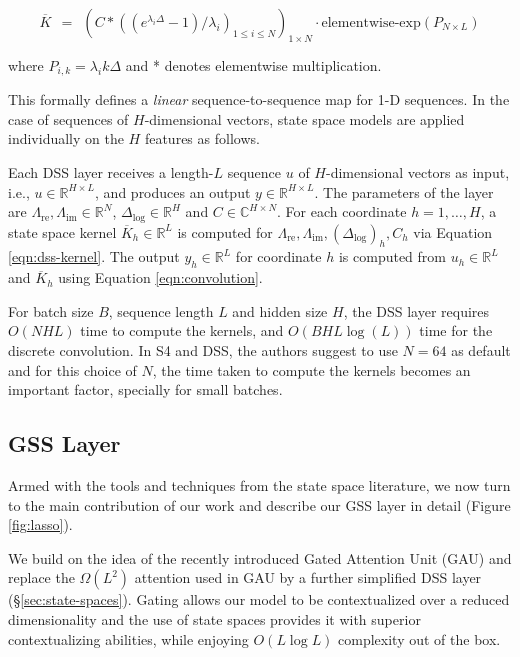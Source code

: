 \begin{equation}\label{eqn:dss-kernel}
\overline{K}\ \ =\ \ (C * \left( (e^{\lambda_i\Delta} - 1) / \lambda_i \right)_{1\leq i \leq N})_{1\times N} \cdot \mathrm{elementwise}\text{-}\mathrm{exp}(P_{N\times L})
\end{equation}

where $P_{i,k} = \lambda_i k\Delta$ and * denotes elementwise multiplication.

This formally defines a \textit{linear} sequence-to-sequence map for 1-D sequences. In the case of sequences of $H$-dimensional vectors, state space models are applied individually on the $H$ features as follows. 

Each \textsc{DSS}  layer receives a length-$L$ sequence $u$ of $H$-dimensional vectors as input, i.e., $u \in \mathbb{R}^{H\times L}$, and produces an output $y \in \mathbb{R}^{H\times L}$. The parameters of the layer are $\Lambda_\mathrm{re}, \Lambda_\mathrm{im} \in \mathbb{R}^N$, $\Delta_{\log} \in \mathbb{R}^{H}$ and $C \in \mathbb{C}^{H \times N}$. For each coordinate $h=1,\ldots,H$, a state space kernel $\overline{K}_h \in \mathbb{R}^L$ is computed for $\Lambda_\mathrm{re}, \Lambda_\mathrm{im}, (\Delta_{\log})_h, C_h$ via Equation \ref{eqn:dss-kernel}. The output $y_h \in \mathbb{R}^L$ for coordinate $h$ is computed from $u_h \in \mathbb{R}^L$ and $\overline{K}_h$ using Equation \ref{eqn:convolution}.

For batch size $B$, sequence length $L$ and hidden size $H$, the DSS layer requires $O(NHL)$ time to compute the kernels, and $O(BHL\log(L))$ time for the discrete convolution. In S4 and DSS, the authors suggest to use $N=64$ as default and for this choice of $N$, the time taken to compute the kernels becomes an important factor, specially for small batches.

\subsection{GSS Layer}\label{sec:lasso}

Armed with the tools and techniques from the state space literature, we now turn to the main contribution of our work and describe our GSS layer in detail (Figure \ref{fig:lasso}).

We build on the idea of the recently introduced Gated Attention Unit (GAU) \citep{flash_hua2022transformer} and replace the $\Omega(L^2)$ attention used in GAU by a further simplified \textsc{DSS}  layer (\S\ref{sec:state-spaces}). Gating allows our model to be contextualized over a reduced dimensionality and the use of state spaces provides it with superior contextualizing abilities, while enjoying $O(L\log L)$ complexity out of the box.

